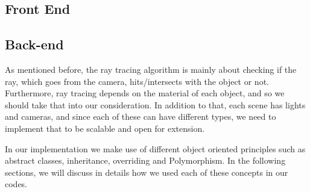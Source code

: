 \documentclass[a4paper]{article}
\begin{document}
	\subsection{Front End}
	\subsection{Back-end}
	As mentioned before, the ray tracing algorithm is mainly about checking if the ray, which goes from the camera, hits/intersects with the object or not. Furthermore, ray tracing depends on the material of each object, and so we should take that into our consideration. In addition to that, each scene has lights and cameras, and since each of these can have different types, we need to implement that to be scalable and open for extension.\\
	\par In our implementation we make use of different object oriented principles such as abstract classes, inheritance, overriding and Polymorphism. In the following sections, we will discuss in details how we used each of these concepts in our codes.
\end{document}
